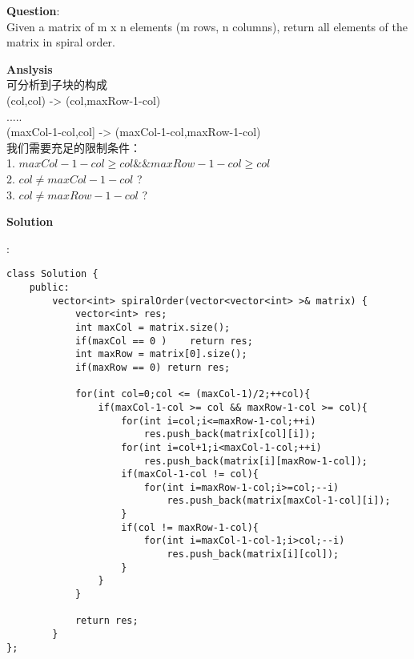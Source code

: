 \begin{description}
    \item{\textbf{Question}}:\\%
	Given a matrix of m x n elements (m rows, n columns), return all elements of the matrix in spiral order.\\

    \item{\textbf{Anslysis}}\\
		可分析到子块的构成\\
		(col,col) -> (col,maxRow-1-col) \\
		.....\\
		(maxCol-1-col,col] -> (maxCol-1-col,maxRow-1-col)\\
		我们需要充足的限制条件：\\
		1.	$maxCol-1-col \ge col \&\& maxRow-1-col \ge col$\\
		2.	$col \ne maxCol-1-col$ ?\\
		3.	$col \ne maxRow-1-col$ ?\\

    \item{\textbf{Solution}}\\
	\item{} : \\
		\begin{lstlisting}
class Solution {
	public:
		vector<int> spiralOrder(vector<vector<int> >& matrix) {
			vector<int> res;
			int maxCol = matrix.size();
			if(maxCol == 0 )	return res;
			int maxRow = matrix[0].size();
			if(maxRow == 0)	return res;

			for(int col=0;col <= (maxCol-1)/2;++col){
				if(maxCol-1-col >= col && maxRow-1-col >= col){
					for(int i=col;i<=maxRow-1-col;++i)
						res.push_back(matrix[col][i]);
					for(int i=col+1;i<maxCol-1-col;++i)
						res.push_back(matrix[i][maxRow-1-col]);
					if(maxCol-1-col != col){
						for(int i=maxRow-1-col;i>=col;--i)
							res.push_back(matrix[maxCol-1-col][i]);
					}
					if(col != maxRow-1-col){
						for(int i=maxCol-1-col-1;i>col;--i)
							res.push_back(matrix[i][col]);
					}
				}
			}

			return res;
		}
};
		\end{lstlisting}

\end{description}

